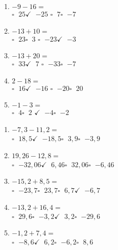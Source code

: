\documentclass[11pt]{article}
\begin{document}
\begin{multicols}{2}
\begin{exercicedevoir}[5][QCM]
\begin{enumerate}[itemsep=0.5em]
\item $ -9-16 =$\\ $\square\;$ $25$\qquad $\checkmark\;$ $-25$\qquad
$\square\;$ $7$\qquad $\square\;$ $-7$\qquad
\item $ -13+10 =$ \\ $\square\;$ $23$\qquad $\square\;$ $3$\qquad
$\square\;$ $-23$\qquad $\checkmark\;$ $-3$\qquad
\item $ -13+20 =$ \\ $\square\;$ $33$\qquad $\checkmark\;$ $7$\qquad
$\square\;$ $-33$\qquad $\square\;$ $-7$\qquad
\item $ 2-18 =$ \\ $\square\;$ $16$\qquad $\checkmark\;$ $-16$\qquad
$\square\;$ $-20$\qquad $\square\;$ $20$\qquad
\item $ -1-3 =$ \\ $\square\;$ $4$\qquad $\square\;$ $2$\qquad
$\checkmark\;$ $-4$\qquad $\square\;$ $-2$\qquad
\end{enumerate}
\end{exercicedevoir}

\begin{exercicedevoir}[5][QCM]
\begin{enumerate}[itemsep=0.5em]
\item  $ -7{,}3-11{,}2 =$ \\ $\square\;$ $18{,}5$\qquad $\checkmark\;$ $-18{,}5$\qquad $\square\;$ $3{,}9$\qquad $\square\;$ $-3{,}9$\qquad  
\item  $ 19{,}26-12{,}8 =$ \\ $\square\;$ $-32{,}06$\qquad $\checkmark\;$ $6{,}46$\qquad $\square\;$ $32{,}06$\qquad $\square\;$ $-6{,}46$\qquad  
\item  $ -15{,}2+8{,}5 =$ \\ $\square\;$ $-23{,}7$\qquad $\square\;$ $23{,}7$\qquad $\square\;$ $6{,}7$\qquad $\checkmark\;$ $-6{,}7$\qquad  
\item  $ -13{,}2+16{,}4 =$ \\ $\square\;$ $29{,}6$\qquad $\square\;$ $-3{,}2$\qquad $\checkmark\;$ $3{,}2$\qquad $\square\;$ $-29{,}6$\qquad  
\item  $ -1{,}2+7{,}4 =$ \\ $\square\;$ $-8{,}6$\qquad $\checkmark\;$ $6{,}2$\qquad $\square\;$ $-6{,}2$\qquad $\square\;$ $8{,}6$\qquad  
\end{enumerate}
\end{exercicedevoir}
\end{multicols}
\end{document}
